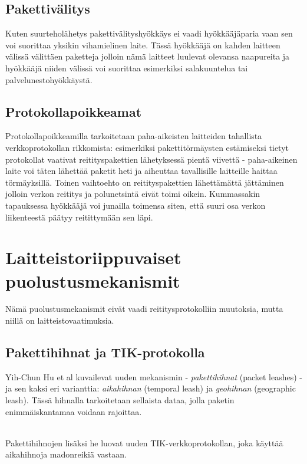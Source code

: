 \documentclass[finnish]{tktltiki2}
\theoremstyle{definition}
\theoremstyle{remark}
\begin{document}
\subsection{Pakettivälitys}

Kuten suurteholähetys pakettivälityshyökkäys ei vaadi hyökkääjäparia vaan sen voi suorittaa yksikin vihamielinen laite. Tässä hyökkääjä on kahden laitteen välissä välittäen paketteja jolloin nämä laitteet luulevat olevansa naapureita ja hyökkääjä niiden välissä voi suorittaa esimerkiksi salakuuntelua tai palvelunestohyökkäystä.


\subsection{Protokollapoikkeamat}

Protokollapoikkeamilla tarkoitetaan paha-aikeisten laitteiden tahallista verkkoprotokollan rikkomista: esimerkiksi pakettitörmäysten estämiseksi tietyt protokollat vaativat reitityspakettien lähetyksessä pientä viivettä - paha-aikeinen laite voi täten lähettää paketit heti ja aiheuttaa tavallisille laitteille haittaa törmäyksillä. Toinen vaihtoehto on reitityspakettien lähettämättä jättäminen jolloin verkon reititys ja polunetsintä eivät toimi oikein. Kummassakin tapauksessa hyökkääjä voi junailla toimensa siten, että suuri osa verkon liikenteestä päätyy reitittymään sen läpi.

\section{Laitteistoriippuvaiset puolustusmekanismit}

Nämä puolustusmekanismit eivät vaadi reititysprotokolliin muutoksia, mutta niillä on laitteistovaatimuksia.

\subsection{Pakettihihnat ja TIK-protokolla}
Yih-Chun Hu et al \cite{leashes} kuvailevat uuden mekanismin - \emph{pakettihihnat} (packet leashes) - ja sen kaksi eri varianttia: \emph{aikahihnan} (temporal leash) ja \emph{geohihnan} (geographic leash). Tässä hihnalla tarkoitetaan sellaista dataa, jolla paketin enimmäiskantamaa voidaan rajoittaa.

\noindent \\
Pakettihihnojen lisäksi he luovat uuden TIK-verkkoprotokollan, joka käyttää aikahihnoja madonreikiä vastaan.
\end{document}
